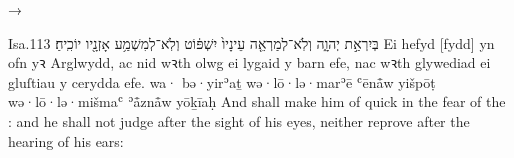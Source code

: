 \begin{frame}{ → }
	\begin{example}{Isa.}{11}{3}{}{}
		\quoling
		{ בְּיִרְאַ֣ת יְהוָ֑ה וְלֹֽא־לְמַרְאֵ֤ה עֵינָיו֙ יִשְׁפּ֔וֹט וְלֹֽא־לְמִשְׁמַ֥ע אָזְנָ֖יו יוֹכִֽיחַ׃}
		{Ei  hefyd [fydd] yn ofn yꝛ Arglwydd, ac nid wꝛth olwg ei lygaid y barn efe, nac wꝛth glywediad ei gluſtiau y cerydda efe.}
		{wa· bə·yirʾaṯ {\YHWH} wə·lō·lə·marʾē ʿēnå̄w yišpōṭ wə·lō·lə·mišmaʿ ʾå̄znå̄w yōḵīaḥ}
		{And shall make him of quick  in the fear of the {\LORD}: and he shall not judge after the sight of his eyes, neither reprove after the hearing of his ears:}
	\end{example}
\end{frame}



\subsubsection{}

